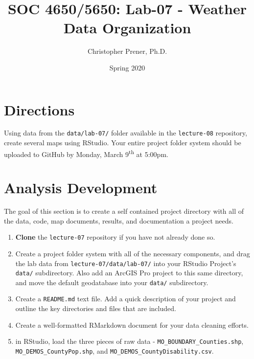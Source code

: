 \documentclass{tufte-handout}
\title{SOC 4650/5650: Lab-07 - Weather Data Organization}
\author{Christopher Prener, Ph.D.}
\date{Spring 2020}
\begin{document}
\maketitle %

\section{Directions}
Using data from the \texttt{data/lab-07/} folder available in the \texttt{lecture-08} repository, create several maps using RStudio. Your entire project folder system should be uploaded to GitHub by Monday, March 9\textsuperscript{th} at 5:00pm.

\vspace{5mm}
\section{Analysis Development}
The goal of this section is to create a self contained project directory with all of the data, code, map documents, results, and documentation a project needs.

\begin{enumerate}[label=\alph*.]
\item \textbf{Clone} the \texttt{lecture-07} repository if you have not already done so.
\item Create a project folder system with all of the necessary components, and drag the lab data from \texttt{lecture-07/data/lab-07/} into your RStudio Project's \texttt{data/} subdirectory. Also add an ArcGIS Pro project to this same directory, and move the default geodatabase into your \texttt{data/} subdirectory.
\item Create a \texttt{README.md} text file. Add a quick description of your project and outline the key directories and files that are included. 
\item Create a well-formatted RMarkdown document for your data cleaning efforts.
\item in RStudio, load the three pieces of raw data - \texttt{MO\_BOUNDARY\_Counties.shp}, \texttt{MO\_DEMOS\_CountyPop.shp}, and \texttt{MO\_DEMOS\_CountyDisability.csv}. 
\end{enumerate}

\vspace{5mm}
\end{document}
